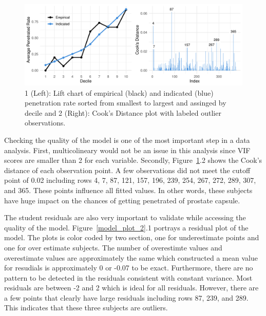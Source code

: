\documentclass[11pt]{article}\usepackage[]{graphicx}\usepackage[]{color}
\makeatletter
\def\maxwidth{ %
  \ifdim\Gin@nat@width>\linewidth
    \linewidth
  \else
    \Gin@nat@width
  \fi
}
\makeatother
\begin{document}
\begin{figure}[h!] 
\begin{center}

\includegraphics[width=\maxwidth]{figure/unnamed-chunk-4-1} 

\caption{1 (Left): Lift chart of empirical (black) and indicated (blue) penetration rate sorted from smallest to largest and assinged by decile and 2 (Right): Cook's Distance plot with labeled outlier observations.}
\label{model_plot_1}
\end{center} 
\end{figure}

\noindent Checking the quality of the model is one of the most important step in a data analysis. First, multicolineary would not be an issue in this analysis since VIF scores are smaller than 2 for each variable. Secondly, Figure~\ref{model_plot_1}.2 shows the Cook's distance of each observation point. A few observations did not meet the cutoff point of 0.02 including rows 4, 7, 87, 121, 157, 196, 239, 254, 267, 272, 289, 307, and 365. These points influence all fitted values. In other words, these subjects have huge impact on the chances of getting penetrated of prostate capsule.     
\hfill \break

\noindent The student residuals are also very important to validate while accessing the quality of the model. Figure~\ref{model_plot_2}.1 portrays a residual plot of the model. The plots is color coded by two section, one for underestimate points and one for over estimate subjects. The number of overestimte values and overestimate values are approximately the same which constructed a mean value for resudials is approximately 0 or -0.07 to be exact. Furthermore, there are no pattern to be detected in the residuals consistent with constant variance. Most residuals are between -2 and 2 which is ideal for all residuals. However, there are a few points that clearly have large residuals including rows 87, 239, and 289. This indicates that these three subjects are outliers.         
\end{document}

